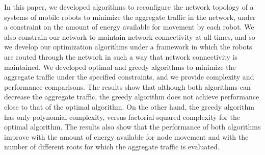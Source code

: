 \documentclass[10pt,conference]{IEEEtran}
\begin{document}
In this paper, we developed algorithms to reconfigure the network
topology of a systems of mobile robots to minimize the aggregate
traffic in the network, under a constraint on the amount of energy
available for movement by each robot.  We also constrain our network
to maintain network connectivity at all times, and so we develop our
optimization algorithms under a framework in which the robots are
routed through the network in such a way that network connectivity is
maintained.  We developed optimal and greedy algorithms to minimize
the aggregate traffic under the specified constraints, and we provide
complexity and performance comparisons.  The results show that
although both algorithms can decrease the aggregate traffic, the
greedy algorithm does not achieve performance close to that of the
optimal algorithm.  On the other hand, the greedy algorithm has only
polynomial complexity, versus factorial-squared complexity for the
optimal algorithm.  The results also show that the performance of both
algorithms improve with the amount of energy available for node
movement and with the number of different roots for which the
aggregate traffic is evaluated.


\end{document}
